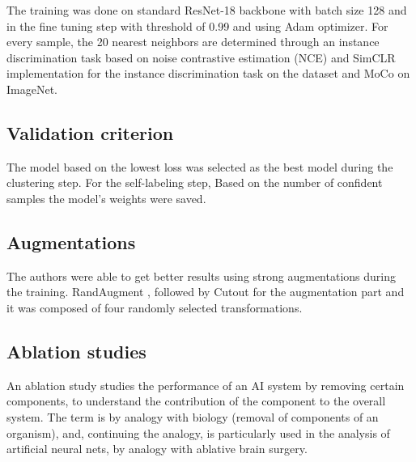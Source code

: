 The training was done on standard ResNet-18 backbone with batch size 128 and in the fine tuning step with threshold of 0.99 and using Adam optimizer. For every sample, the 20 nearest neighbors are determined through an instance discrimination task based on noise contrastive estimation (NCE) \cite{gutmann2010noise}  and SimCLR \cite{chen2020improved} implementation for the instance discrimination task on the dataset and MoCo \cite{chen2020simple} on ImageNet.


\subsection{Validation criterion} 

The model based on the lowest loss was selected as the best model during the clustering step.
For the self-labeling step, Based on the number of confident samples the model’s weights were saved.



\subsection{Augmentations} 

The authors were able to get better results using strong augmentations during the training. 
RandAugment \cite{cubuk2020randaugment}, followed by Cutout \cite{devries2017improved} for the augmentation part and it was composed of four randomly selected transformations.

\newpage

\subsection{Ablation studies} 
An ablation study studies the performance of an AI system by removing certain components, to understand the contribution of the component to the overall system. The term is by analogy with biology (removal of components of an organism), and, continuing the analogy, is particularly used in the analysis of artificial neural nets, by analogy with ablative brain surgery.\cite{DBLP:journals/corr/abs-1901-08644}



